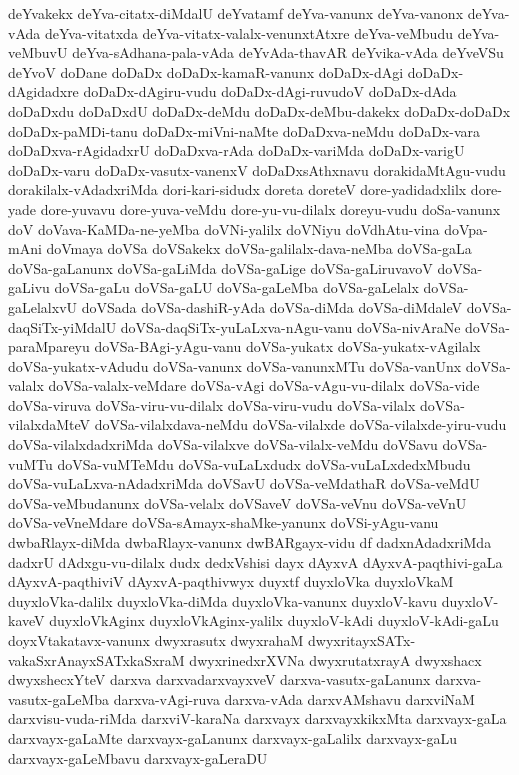 {deYvakekx
deYva-citatx-diMdalU
deYvatamf
deYva-vanunx
deYva-vanonx
deYva-vAda
deYva-vitatxda
deYva-vitatx-valalx-venunxtAtxre
deYva-veMbudu
deYva-veMbuvU
deYva-sAdhana-pala-vAda
deYvAda-thavAR
deYvika-vAda
deYveVSu
deYvoV
doDane
doDaDx
doDaDx-kamaR-vanunx
doDaDx-dAgi
doDaDx-dAgidadxre
doDaDx-dAgiru-vudu
doDaDx-dAgi-ruvudoV
doDaDx-dAda
doDaDxdu
doDaDxdU
doDaDx-deMdu
doDaDx-deMbu-dakekx
doDaDx-doDaDx
doDaDx-paMDi-tanu
doDaDx-miVni-naMte
doDaDxva-neMdu
doDaDx-vara
doDaDxva-rAgidadxrU
doDaDxva-rAda
doDaDx-variMda
doDaDx-varigU
doDaDx-varu
doDaDx-vasutx-vanenxV
doDaDxsAthxnavu
dorakidaMtAgu-vudu
dorakilalx-vAdadxriMda
dori-kari-sidudx
doreta
doreteV
dore-yadidadxlilx
dore-yade
dore-yuvavu
dore-yuva-veMdu
dore-yu-vu-dilalx
doreyu-vudu
doSa-vanunx
doV
doVava-KaMDa-ne-yeMba
doVNi-yalilx
doVNiyu
doVdhAtu-vina
doVpa-mAni
doVmaya
doVSa
doVSakekx
doVSa-galilalx-dava-neMba
doVSa-gaLa
doVSa-gaLanunx
doVSa-gaLiMda
doVSa-gaLige
doVSa-gaLiruvavoV
doVSa-gaLivu
doVSa-gaLu
doVSa-gaLU
doVSa-gaLeMba
doVSa-gaLelalx
doVSa-gaLelalxvU
doVSada
doVSa-dashiR-yAda
doVSa-diMda
doVSa-diMdaleV
doVSa-daqSiTx-yiMdalU
doVSa-daqSiTx-yuLaLxva-nAgu-vanu
doVSa-nivAraNe
doVSa-paraMpareyu
doVSa-BAgi-yAgu-vanu
doVSa-yukatx
doVSa-yukatx-vAgilalx
doVSa-yukatx-vAdudu
doVSa-vanunx
doVSa-vanunxMTu
doVSa-vanUnx
doVSa-valalx
doVSa-valalx-veMdare
doVSa-vAgi
doVSa-vAgu-vu-dilalx
doVSa-vide
doVSa-viruva
doVSa-viru-vu-dilalx
doVSa-viru-vudu
doVSa-vilalx
doVSa-vilalxdaMteV
doVSa-vilalxdava-neMdu
doVSa-vilalxde
doVSa-vilalxde-yiru-vudu
doVSa-vilalxdadxriMda
doVSa-vilalxve
doVSa-vilalx-veMdu
doVSavu
doVSa-vuMTu
doVSa-vuMTeMdu
doVSa-vuLaLxdudx
doVSa-vuLaLxdedxMbudu
doVSa-vuLaLxva-nAdadxriMda
doVSavU
doVSa-veMdathaR
doVSa-veMdU
doVSa-veMbudanunx
doVSa-velalx
doVSaveV
doVSa-veVnu
doVSa-veVnU
doVSa-veVneMdare
doVSa-sAmayx-shaMke-yanunx
doVSi-yAgu-vanu
dwbaRlayx-diMda
dwbaRlayx-vanunx
dwBARgayx-vidu
df
dadxnAdadxriMda
dadxrU
dAdxgu-vu-dilalx
dudx
dedxVshisi
dayx
dAyxvA
dAyxvA-paqthivi-gaLa
dAyxvA-paqthiviV
dAyxvA-paqthivwyx
duyxtf
duyxloVka
duyxloVkaM
duyxloVka-dalilx
duyxloVka-diMda
duyxloVka-vanunx
duyxloV-kavu
duyxloV-kaveV
duyxloVkAginx
duyxloVkAginx-yalilx
duyxloV-kAdi
duyxloV-kAdi-gaLu
doyxVtakatavx-vanunx
dwyxrasutx
dwyxrahaM
dwyxritayxSATx-vakaSxrAnayxSATxkaSxraM
dwyxrinedxrXVNa
dwyxrutatxrayA
dwyxshacx
dwyxshecxYteV
darxva
darxvadarxvayxveV
darxva-vasutx-gaLanunx
darxva-vasutx-gaLeMba
darxva-vAgi-ruva
darxva-vAda
darxvAMshavu
darxviNaM
darxvisu-vuda-riMda
darxviV-karaNa
darxvayx
darxvayxkikxMta
darxvayx-gaLa
darxvayx-gaLaMte
darxvayx-gaLanunx
darxvayx-gaLalilx
darxvayx-gaLu
darxvayx-gaLeMbavu
darxvayx-gaLeraDU
}
